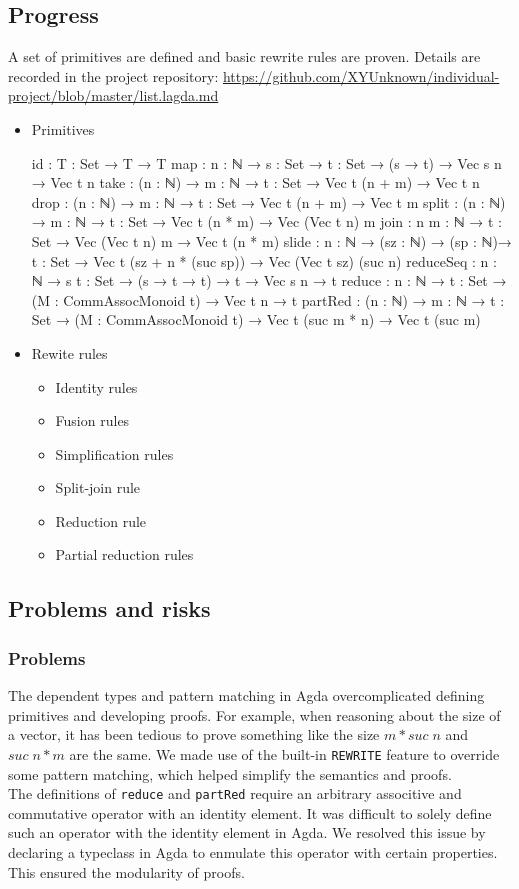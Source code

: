 \documentclass[11pt]{article}
\begin{document}
\subsection{Progress}\label{progress}
A set of primitives are defined and basic rewrite rules are proven. Details are recorded in the 
project repository: \small{\url{https://github.com/XYUnknown/individual-project/blob/master/list.lagda.md}}
\begin{itemize}
    \item Primitives
\begin{code}
id : {T : Set} → T → T
map : {n : ℕ} → {s : Set} → {t : Set} → (s → t) → Vec s n → Vec t n
take : (n : ℕ) → {m : ℕ} → {t : Set} → Vec t (n + m) → Vec t n
drop : (n : ℕ) → {m : ℕ} → {t : Set} → Vec t (n + m) → Vec t m
split : (n : ℕ) → {m : ℕ} → {t : Set} → Vec t (n * m) → 
        Vec (Vec t n) m
join : {n m : ℕ} → {t : Set} → Vec (Vec t n) m → Vec t (n * m)
slide : {n : ℕ} → (sz : ℕ) → (sp : ℕ)→ {t : Set} → 
        Vec t (sz + n * (suc sp)) → Vec (Vec t sz) (suc n)
reduceSeq : {n : ℕ} → {s t : Set} → (s → t → t) → t → Vec s n → t
reduce : {n : ℕ} → {t : Set} → (M : CommAssocMonoid t) → Vec t n → t
partRed : (n : ℕ) → {m : ℕ} → {t : Set} → (M : CommAssocMonoid t) → 
          Vec t (suc m * n) → Vec t (suc m)
\end{code}
    \item Rewite rules
    \begin{itemize}
        \item Identity rules
        \item Fusion rules
        \item Simplification rules
        \item Split-join rule
        \item Reduction rule
        \item Partial reduction rules
    \end{itemize}
\end{itemize}

\subsection{Problems and risks}\label{problems-and-risks}

\subsubsection{Problems}\label{problems}
The dependent types and pattern matching in Agda overcomplicated defining primitives and 
developing proofs. For example, when reasoning about the size of a vector, it has been tedious to 
prove something like the size $m * suc \;n$ and $suc \;n * m$ are the same. We made use of the 
built-in \texttt{REWRITE} feature to override some pattern matching, which helped simplify 
the semantics and proofs.
\\[0.2cm]
The definitions of \texttt{reduce} and \texttt{partRed} require an arbitrary associtive and commutative 
operator with an identity element. It was difficult to solely define such an operator with the identity element in Agda. 
We resolved this issue by declaring a typeclass in Agda to enmulate this operator with certain properties. 
This ensured the modularity of proofs.
\end{document}
